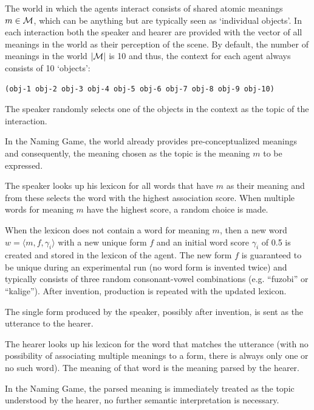  The world in which the agents interact
consists of shared atomic meanings $m \in {\cal M}$, which can be
anything but are typically seen as `individual objects'. In each
interaction both the speaker and hearer are provided with the vector
of all meanings in the world as their perception of the scene. By
default, the number of meanings in the world $|{\cal M}|$ is 10 and
thus, the context for each agent always consists of 10 `objects':
\begin{verbatim}
(obj-1 obj-2 obj-3 obj-4 obj-5 obj-6 obj-7 obj-8 obj-9 obj-10)
\end{verbatim}

 The speaker randomly selects one of the
objects in the context as the topic of the interaction.

 In the Naming Game, the world already
provides pre-conceptualized meanings and consequently, the meaning
chosen as the topic is the meaning $m$ to be expressed.

 The speaker looks up his lexicon for all
words that have $m$ as their meaning and from these selects the word
with the highest association score. When multiple words for meaning
$m$ have the highest score, a random choice is made.

 When the lexicon does not contain a word for
meaning $m$, then a new word $w=\langle m, f, \gamma_{i}\rangle$ with
a new unique form $f$ and an initial word score $\gamma_i$ of 0.5 is
created and stored in the lexicon of the agent. The new form $f$ is
guaranteed to be unique during an experimental run (no word form is
invented twice) and typically consists of three random consonant-vowel
combinations (e.g. ``fuzobi'' or ``kalige''). After invention,
production is repeated with the updated lexicon.

 The single form produced by the speaker,
possibly after invention, is sent as the utterance to the hearer.

 The hearer looks up his lexicon for the word
that matches the utterance (with no possibility of associating multiple
meanings to a form, there is always only one or no such word). The
meaning of that word is the meaning parsed by the hearer.

 In the Naming Game, the parsed meaning is
immediately treated as the topic understood by the hearer, no further
semantic interpretation is necessary.

